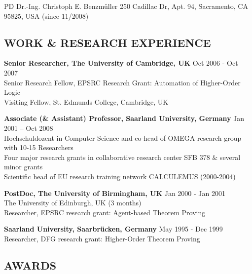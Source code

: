 \documentclass{article}
\newcommand{\tmtextbf}[1]{{\bfseries{#1}}}
\begin{document}
{\vspace{-3cm}}

\begin{center}
  {\Large PD Dr.-Ing. Christoph E. Benzm\"uller}  250 Cadillac Dr, Apt. 94,
  Sacramento, CA 95825, USA (since 11/2008)
\end{center}

{\vspace{.5cm}}

\subsection*{WORK \& RESEARCH EXPERIENCE}

{\noindent}\tmtextbf{Senior Researcher, The University of Cambridge, UK}
{\hspace*{\fill}}Oct 2006 - Oct 2007\\
Senior Research Fellow, EPSRC Research Grant: Automation of Higher-Order
Logic\\
Visiting Fellow, St. Edmunds College, Cambridge, UK

{\noindent}\tmtextbf{Associate (\& Assistant) Professor, Saarland University,
Germany} {\hspace*{\fill}}Jan 2001 -- Oct 2008\\
Hochschuldozent in Computer Science and co-head of OMEGA research group with
10-15 Researchers\\
Four major research grants in collaborative research center SFB 378 \& several
minor grants\\
Scientific head of EU research training network CALCULEMUS (2000-2004)

{\noindent}\tmtextbf{PostDoc, The University of Birmingham, UK}
{\hspace*{\fill}}Jan 2000 - Jan 2001\\
The University of Edinburgh, UK {\hspace*{\fill}}(3 months)\\
Researcher, EPSRC research grant: Agent-based Theorem Proving

{\noindent}\tmtextbf{Saarland University, Saarbr\"ucken, Germany}
{\hspace*{\fill}}May 1995 - Dec 1999\\
Researcher, DFG research grant: Higher-Order Theorem Proving

\subsection*{AWARDS}
\end{document}
